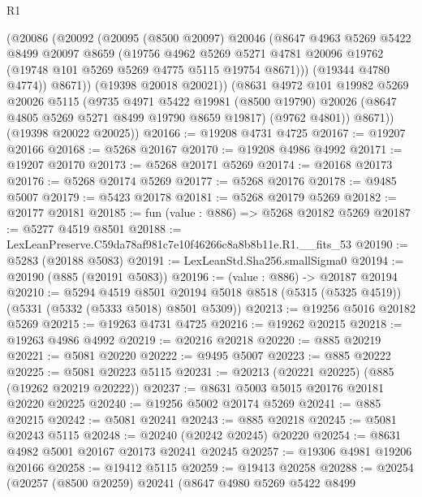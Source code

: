 \begin{lexlean}{R1}
\begin{coremodule}
          (@20086
            (@20092
              (@20095
                (@8500 @20097)
                @20046
                (@8647
                  @4963
                  @5269
                  @5422
                  @8499
                  @20097
                  @8659
                  (@19756
                    @4962
                    @5269
                    @5271
                    @4781
                    @20096
                    @19762
                    (@19748 @101 @5269 @5269 @4775 @5115 @19754 @8671)))
                (@19344 @4780 @4774))
              @8671))
          (@19398 @20018 @20021))
        (@8631
          @4972
          @101
          @19982
          @5269
          @20026
          @5115
          (@9735
            @4971
            @5422
            @19981
            (@8500 @19790)
            @20026
            (@8647 @4805 @5269 @5271 @8499 @19790 @8659 @19817)
            (@9762 @4801))
          @8671))
      (@19398 @20022 @20025))
@20166 := @19208 @4731 @4725
@20167 := @19207 @20166
@20168 := @5268 @20167
@20170 := @19208 @4986 @4992
@20171 := @19207 @20170
@20173 := @5268 @20171 @5269
@20174 := @20168 @20173
@20176 := @5268 @20174 @5269
@20177 := @5268 @20176
@20178 := @9485 @5007
@20179 := @5423 @20178
@20181 := @5268 @20179 @5269
@20182 := @20177 @20181
@20185 := fun (value : @886) => @5268 @20182 @5269
@20187 := @5277 @4519 @8501
@20188 := LexLeanPreserve.C59da78af981c7e10f46266c8a8b8b11e.R1.__fits_53
@20190 := @5283 (@20188 @5083)
@20191 := LexLeanStd.Sha256.smallSigma0
@20194 := @20190 (@885 (@20191 @5083))
@20196 := (value : @886) -> @20187 @20194
@20210 := @5294
    @4519
    @8501
    @20194
    @5018
    @8518
    (@5315 (@5325 @4519))
    (@5331 (@5332 (@5333 @5018) @8501 @5309))
@20213 := @19256 @5016 @20182 @5269
@20215 := @19263 @4731 @4725
@20216 := @19262 @20215
@20218 := @19263 @4986 @4992
@20219 := @20216 @20218
@20220 := @885 @20219
@20221 := @5081 @20220
@20222 := @9495 @5007
@20223 := @885 @20222
@20225 := @5081 @20223 @5115
@20231 := @20213 (@20221 @20225) (@885 (@19262 @20219 @20222))
@20237 := @8631 @5003 @5015 @20176 @20181 @20220 @20225
@20240 := @19256 @5002 @20174 @5269
@20241 := @885 @20215
@20242 := @5081 @20241
@20243 := @885 @20218
@20245 := @5081 @20243 @5115
@20248 := @20240 (@20242 @20245) @20220
@20254 := @8631 @4982 @5001 @20167 @20173 @20241 @20245
@20257 := @19306 @4981 @19206 @20166
@20258 := @19412 @5115
@20259 := @19413 @20258
@20288 := @20254
    (@20257
      (@8500 @20259)
      @20241
      (@8647
        @4980
        @5269
        @5422
        @8499

\end{coremodule}
\end{lexlean}
